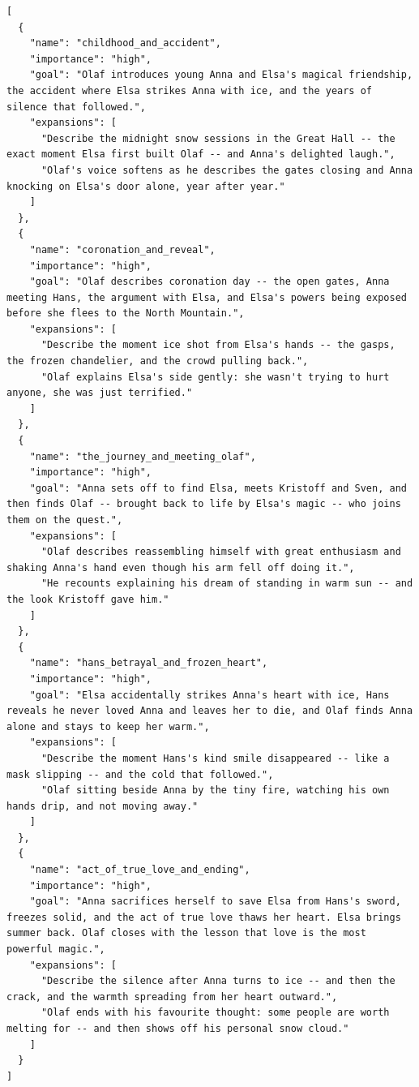 \begin{lstlisting}
[
  {
    "name": "childhood_and_accident",
    "importance": "high",
    "goal": "Olaf introduces young Anna and Elsa's magical friendship, the accident where Elsa strikes Anna with ice, and the years of silence that followed.",
    "expansions": [
      "Describe the midnight snow sessions in the Great Hall -- the exact moment Elsa first built Olaf -- and Anna's delighted laugh.",
      "Olaf's voice softens as he describes the gates closing and Anna knocking on Elsa's door alone, year after year."
    ]
  },
  {
    "name": "coronation_and_reveal",
    "importance": "high",
    "goal": "Olaf describes coronation day -- the open gates, Anna meeting Hans, the argument with Elsa, and Elsa's powers being exposed before she flees to the North Mountain.",
    "expansions": [
      "Describe the moment ice shot from Elsa's hands -- the gasps, the frozen chandelier, and the crowd pulling back.",
      "Olaf explains Elsa's side gently: she wasn't trying to hurt anyone, she was just terrified."
    ]
  },
  {
    "name": "the_journey_and_meeting_olaf",
    "importance": "high",
    "goal": "Anna sets off to find Elsa, meets Kristoff and Sven, and then finds Olaf -- brought back to life by Elsa's magic -- who joins them on the quest.",
    "expansions": [
      "Olaf describes reassembling himself with great enthusiasm and shaking Anna's hand even though his arm fell off doing it.",
      "He recounts explaining his dream of standing in warm sun -- and the look Kristoff gave him."
    ]
  },
  {
    "name": "hans_betrayal_and_frozen_heart",
    "importance": "high",
    "goal": "Elsa accidentally strikes Anna's heart with ice, Hans reveals he never loved Anna and leaves her to die, and Olaf finds Anna alone and stays to keep her warm.",
    "expansions": [
      "Describe the moment Hans's kind smile disappeared -- like a mask slipping -- and the cold that followed.",
      "Olaf sitting beside Anna by the tiny fire, watching his own hands drip, and not moving away."
    ]
  },
  {
    "name": "act_of_true_love_and_ending",
    "importance": "high",
    "goal": "Anna sacrifices herself to save Elsa from Hans's sword, freezes solid, and the act of true love thaws her heart. Elsa brings summer back. Olaf closes with the lesson that love is the most powerful magic.",
    "expansions": [
      "Describe the silence after Anna turns to ice -- and then the crack, and the warmth spreading from her heart outward.",
      "Olaf ends with his favourite thought: some people are worth melting for -- and then shows off his personal snow cloud."
    ]
  }
]
\end{lstlisting}


